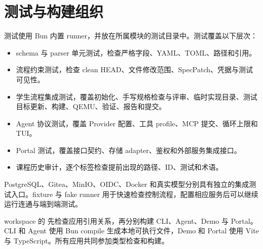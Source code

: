 \section{测试与构建组织}

测试使用 Bun 内置 runner，并放在所属模块的测试目录中。测试覆盖以下层次：

\begin{itemize}
  \item schema 与 parser 单元测试，检查严格字段、YAML、TOML、路径和引用。
  \item 流程约束测试，检查 clean HEAD、文件修改范围、SpecPatch、凭据与测试可见性。
  \item 学生流程集成测试，覆盖初始化、手写规格检查与评审、临时实现目录、测试目标更新、构建、QEMU、验证、报告和提交。
  \item Agent 协议测试，覆盖 Provider 配置、工具 profile、MCP 提交、循环上限和 TUI。
  \item Portal 测试，覆盖接口契约、存储 adapter、鉴权和外部服务集成接口。
  \item 课程历史审计，逐个标签检查提前出现的路径、ID、测试和术语。
\end{itemize}

PostgreSQL、Gitea、MinIO、OIDC、Docker 和真实模型分别具有独立的集成测试入口。fixture 与 fake runner 用于快速检查控制流程，配置相应服务后可以继续运行连通与端到端测试。

workspace 的  先检查应用引用关系，再分别构建 CLI、Agent、Demo 与 Portal。CLI 和 Agent 使用 Bun compile 生成本地可执行文件，Demo 和 Portal 使用 Vite 与 TypeScript。所有应用共同参加类型检查和构建。
